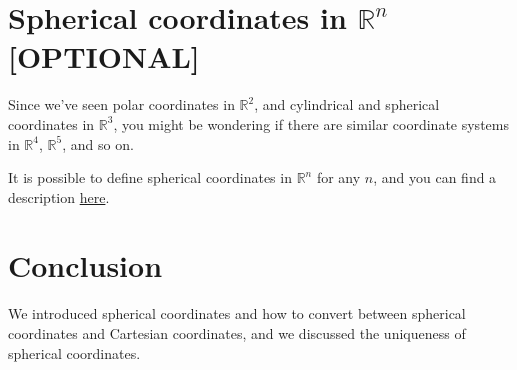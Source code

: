 \documentclass{ximera}
\begin{document}
\section*{Spherical coordinates in $\mathbb{R}^n$ [OPTIONAL]}

Since we've seen polar coordinates in $\mathbb{R}^2$, and cylindrical and spherical coordinates in $\mathbb{R}^3$, you might be wondering if there are similar coordinate systems in $\mathbb{R}^4$, $\mathbb{R}^5$, and so on.

It is possible to define spherical coordinates in $\mathbb{R}^n$ for any $n$, and you can find a description \href{https://en.wikipedia.org/wiki/N-sphere#Spherical_coordinates
}{here}. 

\section*{Conclusion}

We introduced spherical coordinates and how to convert between spherical coordinates and Cartesian coordinates, and we discussed the uniqueness of spherical coordinates.
\end{document}
